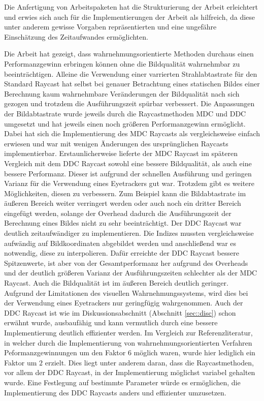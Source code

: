 Die Anfertigung von Arbeitspaketen hat die Strukturierung der Arbeit erleichtert und erwies sich auch für die Implementierungen der Arbeit als hilfreich, da diese unter anderem gewisse Vorgaben repräsentierten und eine ungefähre Einschätzung des Zeitaufwandes ermöglichten.

Die Arbeit hat gezeigt, dass wahrnehmungsorientierte Methoden durchaus einen Performanzgewinn erbringen können ohne die Bildqualität wahrnehmbar zu beeinträchtigen.
Alleine die Verwendung einer varrierten Strahlabtastrate für den Standard Raycast hat selbst bei genauer Betrachtung eines statischen Bildes einer Berechnung kaum wahrnehmbare Veränderungen der Bildqualität nach sich gezogen und trotzdem die Ausführungszeit spürbar verbessert.
Die Anpassungen der Bildabtastrate wurde jeweils durch die Raycastmethoden MDC und DDC umgesetzt und hat jeweils einen noch größeren Performanzgewinn ermöglicht.
Dabei hat sich die Implementierung des MDC Raycasts als vergleichsweise einfach erwiesen und war mit wenigen Änderungen des ursprünglichen Raycasts implementierbar.
Erstaunlicherweise lieferte der MDC Raycast im späteren Vergleich mit dem DDC Raycast sowohl eine bessere Bildqualität, als auch eine bessere Performanz.
Dieser ist aufgrund der schnellen Ausführung und geringen Varianz für die Verwendung eines Eyetrackers gut war.
Trotzdem gibt es weitere Möglichkeiten, diesen zu verbessern. 
Zum Beispiel kann die Bildabtastrate im äußeren Bereich weiter verringert werden oder auch noch ein dritter Bereich eingefügt werden, solange der Overhead dadurch die Ausführungszeit der Berechnung eines Bildes nicht zu sehr beeinträchtigt.
Der DDC Raycast war deutlich zeitaufwändiger zu implementieren.
Die Indizes mussten vergleichsweise aufwändig auf Bildkoordinaten abgebildet werden und anschließend war es notwendig, diese zu interpolieren.
Dafür erreichte der DDC Raycast bessere Spitzenwerte, ist aber von der Gesamtperformanz her aufgrund des Overheads und der deutlich größeren Varianz der Ausführungszeiten schlechter als der MDC Raycast.
Auch die Bildqualität ist im äußeren Bereich deutlich geringer.
Aufgrund der Limitationen des visuellen Wahrnehmungssystems, wird dies bei der Verwendung eines Eyetrackers nur geringfügig wahrgenommen.
Auch der DDC Raycast ist wie im Diskussionsabschnitt (Abschnitt \ref{sec::disc}) schon erwähnt wurde, ausbaufähig und kann vermutlich durch eine bessere Implementierung deutlich effizienter werden.
Im Vergleich zur Referenzliteratur, in welcher durch die Implementierung von wahrnehmungsorientierten Verfahren Peformanzgewinnungen um den Faktor $6$ möglich waren, wurde hier lediglich ein Faktor um $2$ erzielt.
Dies liegt unter anderem daran, dass die Raycastmethoden, vor allem der DDC Raycast, in der Implementierung möglichst variabel gehalten wurde.
Eine Festlegung auf bestimmte Parameter würde es ermöglichen, die Implementierung des DDC Raycasts anders und effizienter umzusetzen.


